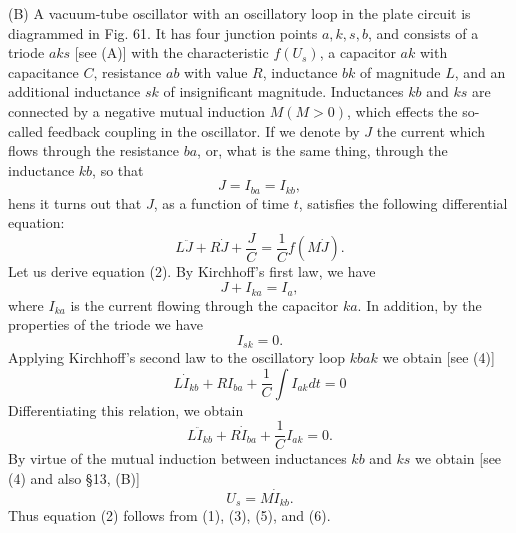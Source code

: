 \documentclass[10pt,a5paper]{book}
\theoremstyle{plain}
\theoremstyle{definition}
\theoremstyle{remark}
\begin{document}
(B) A vacuum-tube oscillator with an oscillatory loop in the plate circuit is diagrammed in Fig. 61. It has four junction points $a, k, s, b$, and consists of a triode $a k s$ [see (A)] with the characteristic $f\left(U_{s}\right)$, a capacitor $a k$ with capacitance $C$, resistance $a b$ with value $R$, inductance $b k$ of magnitude
$L$, and an additional inductance $s k$ of insignificant magnitude. Inductances $k b$ and $k s$ are connected by a negative mutual induction $M(M>0)$, which effects the so-called feedback coupling in the oscillator. If we denote by $J$ the current which flows through the resistance $b a$, or, what is the same thing, through the inductance $k b$, so that
\[
J=I_{b a}=I_{k b},
\]
hens it turns out that $J$, as a function of time $t$, satisfies the following differential equation:
\begin{equation*}
L \ddot{J}+R \dot{J}+\frac{J}{C}=\frac{1}{C} f(M \dot{J}) . \tag{2}
\end{equation*}
Let us derive equation (2). By Kirchhoff's first law, we have
\begin{equation*}
J+I_{k a}=I_{a}, \tag{3}
\end{equation*}
where $I_{k a}$ is the current flowing through the capacitor $k a$. In addition, by the properties of the triode we have
\begin{equation*}
I_{s k}=0 . \tag{4}
\end{equation*}
Applying Kirchhoff's second law to the oscillatory loop $k b a k$ we obtain [see (4)]
\[
L \dot{I}_{k b}+R I_{b a}+\frac{1}{C} \int I_{a k} d t=0
\]
Differentiating this relation, we obtain
\begin{equation*}
L \ddot{I}_{k b}+R \dot{I}_{b a}+\frac{1}{C} I_{a k}=0 . \tag{5}
\end{equation*}
By virtue of the mutual induction between inductances $k b$ and $k s$ we obtain [see (4) and also §13, (B)]
\begin{equation*}
U_{s}=M \dot{I}_{k b} . \tag{6}
\end{equation*}
Thus equation (2) follows from (1), (3), (5), and (6).
\end{document}
